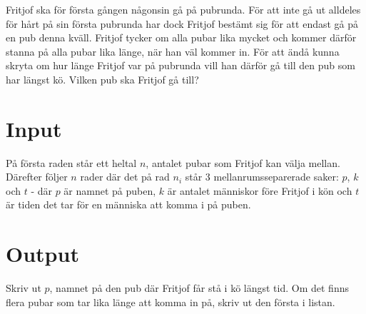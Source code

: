 
Fritjof ska för första gången någonsin gå på pubrunda. För att inte gå ut alldeles för hårt på sin första pubrunda har dock Fritjof bestämt sig för att endast gå på en pub denna kväll. Fritjof tycker om alla pubar lika mycket och kommer därför stanna på alla pubar lika länge, när han väl kommer in. För att ändå kunna skryta om hur länge Fritjof var på pubrunda vill han därför gå till den pub som har längst kö. Vilken pub ska Fritjof gå till?

\section*{Input}

På första raden står ett heltal $n$, antalet pubar som Fritjof kan välja mellan. Därefter följer $n$ rader där det på rad $n_i$ står 3 mellanrumsseparerade saker: $p$, $k$ och $t$ - där $p$ är namnet på puben, $k$ är antalet människor före Fritjof i kön och $t$ är tiden det tar för en människa att komma i på puben.

\section*{Output}

Skriv ut $p$, namnet på den pub där Fritjof får stå i kö längst tid. Om det finns flera pubar som tar lika länge att komma in på, skriv ut den första i listan. 
